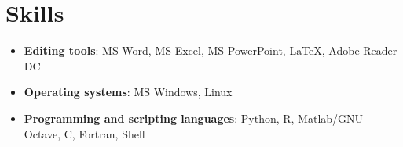 \documentclass[letterpaper,11pt]{article}
\newcommand{\resumeItem}[2]{
	\item\small{
		\textbf{#1}{: #2 \vspace{-2pt}}
	}
}
\newcommand{\resumeSubItem}[2]{\resumeItem{#1}{#2}\vspace{-4pt}}
\newcommand{\resumeSubHeadingListStart}{\begin{itemize}[leftmargin=*]}
\newcommand{\resumeSubHeadingListEnd}{\end{itemize}}
\begin{document}
	
	\section{Skills}
	\resumeSubHeadingListStart
	\resumeSubItem{Editing tools}
	{MS Word, MS Excel, MS PowerPoint, \LaTeX, Adobe Reader DC}
	\resumeSubItem{Operating systems}
	{MS Windows, Linux}
	\resumeSubItem{Programming and scripting languages}
	{Python, R, Matlab/GNU Octave, C, Fortran, Shell}
	\resumeSubHeadingListEnd
	
\end{document}
